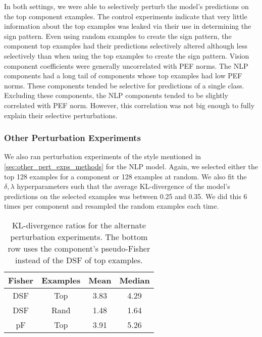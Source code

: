 \documentclass[dvipsnames]{article}
\begin{document}
In both settings, we were able to selectively perturb the model's predictions on the top component examples.
The control experiments indicate that very little information about the top examples was leaked via their use in determining the sign pattern.
Even using random examples to create the sign pattern, the component top examples had their predictions selectively altered although less selectively than when using the top examples to create the sign pattern.
Vision component coefficients were generally uncorrelated with PEF norms.
The NLP components had a long tail of components whose top examples had low PEF norms.
These components tended be selective for predictions of a single class.
Excluding these components, the NLP components tended to be slightly correlated with PEF norm.
However, this correlation was not big enough to fully explain their selective perturbations.

\subsubsection{Other Perturbation Experiments}
We also ran perturbation experiments of the style mentioned in \cref{sec:other_pert_exps_methods} for the NLP model.
Again, we selected either the top 128 examples for a component or 128 examples at random.
We also fit the $\delta,\lambda$ hyperparameters such that the average KL-divergence of the model's predictions on the selected examples was between 0.25 and 0.35.
We did this 6 times per component and resampled the random examples each time.

\begin{table}[t]
\caption{%
KL-divergence ratios for the alternate perturbation experiments. The bottom row uses the component's pseudo-Fisher instead of the DSF of top examples.
}
\label{table:ex_dsf_ratios}
\vskip 0.15in
\begin{center}
\begin{small}
\begin{sc}
\begin{tabular}{cccc}
\toprule
Fisher & Examples & Mean & Median \\
\midrule
DSF & Top & 3.83 & 4.29 \\
DSF & Rand\. & 1.48 & 1.64 \\
pF & Top & 3.91 & 5.26 \\
\bottomrule
\end{tabular}
\end{sc}
\end{small}
\end{center}
\vskip -0.1in
\end{table}
\end{document}
